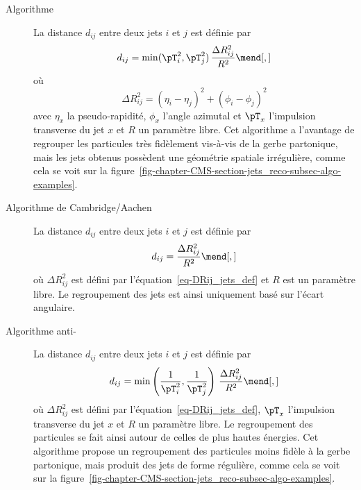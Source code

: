 \begin{description}
\item[Algorithme \kT~\cite{Catani_kT_algo}] La distance $d_{ij}$ entre deux jets $i$ et $j$ est définie par
\begin{equation}
d_{ij} = \min({\pT}_i^2, {\pT}_j^2) \, \frac{\Delta R_{ij}^2}{R^2}
\mend[,]
\end{equation}
où
\begin{equation}
\Delta R_{ij}^2 = (\eta_i-\eta_j)^2 + (\phi_i-\phi_j)^2
\label{eq-DRij_jets_def}
\end{equation}
avec $\eta_x$ la pseudo-rapidité,
$\phi_x$ l'angle azimutal et
${\pT}_x$ l'impulsion transverse du jet $x$ et
$R$ un paramètre libre.
Cet algorithme a l'avantage de regrouper les particules très fidèlement vis-à-vis de la gerbe partonique, mais les jets obtenus possèdent une géométrie spatiale irrégulière, comme cela se voit sur la figure~\ref{fig-chapter-CMS-section-jets_reco-subsec-algo-examples}.
\item[Algorithme de Cambridge/Aachen~\cite{Dokshitzer_1997,wobisch1999hadronization}] La distance $d_{ij}$ entre deux jets $i$ et $j$ est définie par
\begin{equation}
d_{ij} = \frac{\Delta R_{ij}^2}{R^2}
\mend[,]
\end{equation}
où $\Delta R_{ij}^2$ est défini par l'équation~\eqref{eq-DRij_jets_def}
et $R$ est un paramètre libre. Le regroupement des jets est ainsi uniquement basé sur l'écart angulaire.
\item[Algorithme anti-\kT~\cite{Cacciari_antikT}] La distance $d_{ij}$ entre deux jets $i$ et $j$ est définie par
\begin{equation}
d_{ij} = \min\left(\frac{1}{{\pT}_i^2}, \frac{1}{{\pT}_j^2}\right) \, \frac{\Delta R_{ij}^2}{R^2}
\mend[,]
\end{equation}
où $\Delta R_{ij}^2$ est défini par l'équation~\eqref{eq-DRij_jets_def},
${\pT}_x$ l'impulsion transverse du jet $x$ et $R$ un paramètre libre.
Le regroupement des particules se fait ainsi autour de celles de plus hautes énergies.
Cet algorithme propose un regroupement des particules moins fidèle à la gerbe partonique, mais produit des jets de forme régulière, comme cela se voit sur la figure~\ref{fig-chapter-CMS-section-jets_reco-subsec-algo-examples}.
\end{description}
